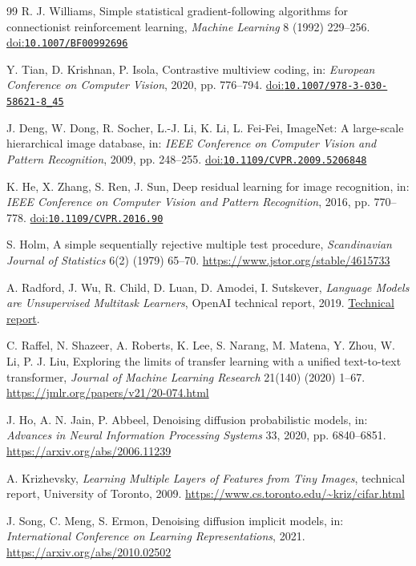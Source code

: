 \documentclass[a4paper,fleqn]{cas-dc}
\providecommand{\doi}[1]{%
  \href{https://doi.org/#1}{doi:\nolinkurl{#1}}}
\begin{document}
\begin{thebibliography}{99}
R. J. Williams,
Simple statistical gradient-following algorithms
for connectionist reinforcement learning,
\emph{Machine Learning} 8 (1992) 229--256.
\doi{10.1007/BF00992696}


Y. Tian, D. Krishnan, P. Isola,
Contrastive multiview coding,
in: \emph{European Conference on Computer Vision},
2020, pp. 776--794.
\doi{10.1007/978-3-030-58621-8_45}


J. Deng, W. Dong, R. Socher, L.-J. Li, K. Li, L. Fei-Fei,
ImageNet: A large-scale hierarchical image database,
in: \emph{IEEE Conference on Computer Vision and Pattern Recognition},
2009, pp. 248--255.
\doi{10.1109/CVPR.2009.5206848}


K. He, X. Zhang, S. Ren, J. Sun,
Deep residual learning for image recognition,
in: \emph{IEEE Conference on Computer Vision and Pattern Recognition},
2016, pp. 770--778.
\doi{10.1109/CVPR.2016.90}


S. Holm,
A simple sequentially rejective multiple test procedure,
\emph{Scandinavian Journal of Statistics}
6(2) (1979) 65--70.
\url{https://www.jstor.org/stable/4615733}


A. Radford, J. Wu, R. Child, D. Luan, D. Amodei, I. Sutskever,
\emph{Language Models are Unsupervised Multitask Learners},
OpenAI technical report, 2019.
\href{https://cdn.openai.com/better-language-models/language_models_are_unsupervised_multitask_learners.pdf}
{Technical report}.


C. Raffel, N. Shazeer, A. Roberts, K. Lee, S. Narang,
M. Matena, Y. Zhou, W. Li, P. J. Liu,
Exploring the limits of transfer learning with a
unified text-to-text transformer,
\emph{Journal of Machine Learning Research}
21(140) (2020) 1--67.
\url{https://jmlr.org/papers/v21/20-074.html}


J. Ho, A. N. Jain, P. Abbeel,
Denoising diffusion probabilistic models,
in: \emph{Advances in Neural Information Processing Systems}
33, 2020, pp. 6840--6851.
\url{https://arxiv.org/abs/2006.11239}


A. Krizhevsky,
\emph{Learning Multiple Layers of Features from Tiny Images},
technical report, University of Toronto, 2009.
\url{https://www.cs.toronto.edu/~kriz/cifar.html}


J. Song, C. Meng, S. Ermon,
Denoising diffusion implicit models,
in: \emph{International Conference on Learning Representations}, 2021.
\url{https://arxiv.org/abs/2010.02502}



\end{thebibliography}
\end{document}

